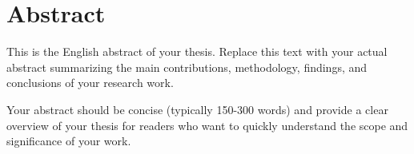 \pagestyle{empty}

\chapter*{Abstract}


This is the English abstract of your thesis. Replace this text with your actual abstract summarizing the main contributions, methodology, findings, and conclusions of your research work.

Your abstract should be concise (typically 150-300 words) and provide a clear overview of your thesis for readers who want to quickly understand the scope and significance of your work.

\newpage
